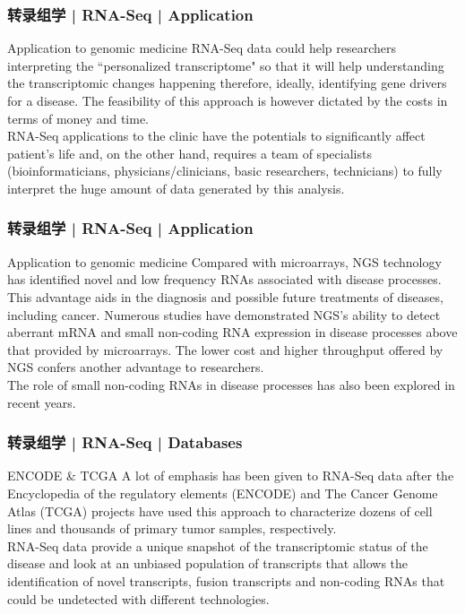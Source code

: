 \begin{frame}
  \frametitle{转录组学 | RNA-Seq | Application}
  \begin{block}{Application to genomic medicine}
  RNA-Seq data could help researchers interpreting the ``personalized transcriptome" so that it will help understanding the transcriptomic changes happening therefore, ideally, identifying gene drivers for a disease. The feasibility of this approach is however dictated by the costs in terms of money and time.\\
  \vspace{1em}
  RNA-Seq applications to the clinic have the potentials to significantly affect patient's life and, on the other hand, requires a team of specialists (bioinformaticians, physicians/clinicians, basic researchers, technicians) to fully interpret the huge amount of data generated by this analysis.
  \end{block}
\end{frame}

\begin{frame}
  \frametitle{转录组学 | RNA-Seq | Application}
  \begin{block}{Application to genomic medicine}
  Compared with microarrays, NGS technology has identified novel and low frequency RNAs associated with disease processes. This advantage aids in the diagnosis and possible future treatments of diseases, including cancer. Numerous studies have demonstrated NGS's ability to detect aberrant mRNA and small non-coding RNA expression in disease processes above that provided by microarrays. The lower cost and higher throughput offered by NGS confers another advantage to researchers.\\
  \vspace{1em}
  The role of small non-coding RNAs in disease processes has also been explored in recent years.
  \end{block}
\end{frame}

\begin{frame}
  \frametitle{转录组学 | RNA-Seq | Databases}
  \begin{block}{ENCODE \& TCGA}
 A lot of emphasis has been given to RNA-Seq data after the Encyclopedia of the regulatory elements (ENCODE) and The Cancer Genome Atlas (TCGA) projects have used this approach to characterize dozens of cell lines and thousands of primary tumor samples, respectively.\\
 \vspace{1em}
 RNA-Seq data provide a unique snapshot of the transcriptomic status of the disease and look at an unbiased population of transcripts that allows the identification of novel transcripts, fusion transcripts and non-coding RNAs that could be undetected with different technologies.
  \end{block}
\end{frame}

